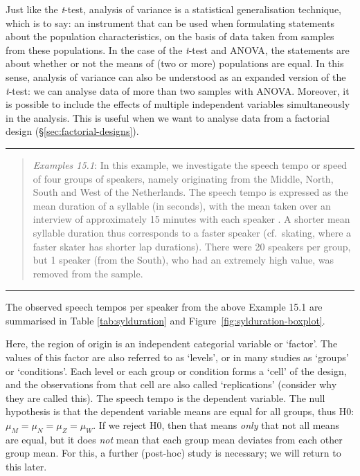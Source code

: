 \documentclass[
]{book}
\begin{document}
Just like the \emph{t}-test, analysis of variance is a statistical generalisation
technique, which is to say: an instrument that can be used
when formulating statements about the population characteristics,
on the basis of data taken from samples from these populations.
In the case of the \emph{t}-test and ANOVA, the statements are about
whether or not the means of (two or more) populations are equal.
In this sense, analysis of variance can also be understood as an
expanded version of the \emph{t}-test: we can analyse data
of more than two samples with ANOVA. Moreover, it is possible to include the effects
of multiple independent variables simultaneously in the analysis. This is useful
when we want to analyse data from a factorial design
(§\ref{sec:factorial-designs}).

\begin{center}\rule{0.5\linewidth}{0.5pt}\end{center}

\begin{quote}
\emph{Examples 15.1}: In this example, we investigate the speech tempo or
speed of four groups of speakers, namely originating from the Middle, North,
South and West of the Netherlands. The speech tempo is expressed as the mean
duration of a syllable (in seconds), with the mean taken over an interview of approximately
15 minutes with each speaker \citep{Quene08} \citep{R-hqmisc}.
A shorter mean syllable duration thus corresponds to a faster speaker (cf.~skating, where a faster skater has shorter lap durations). There were 20
speakers per group, but 1 speaker (from the South), who had an extremely high value,
was removed from the sample.
\end{quote}

\begin{center}\rule{0.5\linewidth}{0.5pt}\end{center}

The observed speech tempos per speaker from the above Example 15.1 are summarised
in Table \ref{tab:sylduration} and Figure~\ref{fig:sylduration-boxplot}.

Here, the region of origin is an independent categorial variable or `factor'.
The values of this factor are also referred to as `levels', or in many studies
as `groups' or `conditions'. Each level or each group or condition forms
a `cell' of the design, and the observations from that cell are also
called `replications' (consider why they are called this).
The speech tempo is the dependent variable. The null hypothesis is that the
dependent variable means are equal for all groups, thus
H0: \(\mu_M = \mu_N = \mu_Z = \mu_W\). If we reject H0, then that means
\emph{only} that not all means are equal, but it does \emph{not} mean that each group
mean deviates from each other group mean. For this, a further (post-hoc)
study is necessary; we will return to this later.
\end{document}
